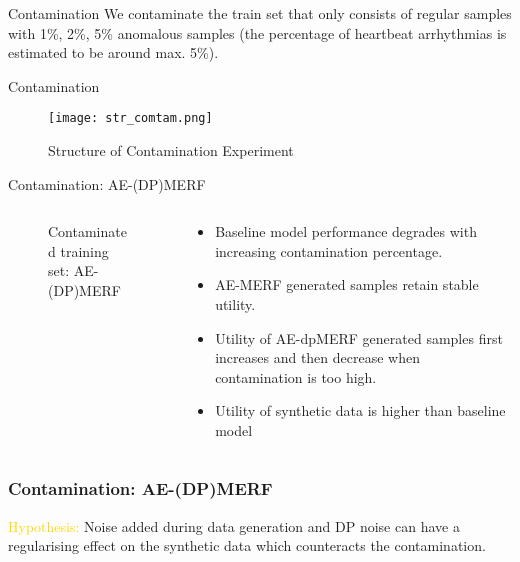 \begin{frame}{Contamination}
    We \alert{contaminate} the train set that only consists of regular samples with \alert{1\%, 2\%, 5\% anomalous samples} (the percentage of heartbeat arrhythmias is estimated to be around max. 5\%).
\end{frame}

\begin{frame}{Contamination}

    \begin{figure}[h]
        \centering
        \texttt{[image: str\_comtam.png]}
        \caption{Structure of Contamination Experiment}
        \label{fig:enter-label}
    \end{figure}

\end{frame}

\begin{frame}{Contamination: AE-(DP)MERF}
    \begin{columns}
        \begin{column}{0.65\textwidth}
            \begin{figure}

                \centering
        
                \caption{Contaminated training set: AE-(DP)MERF}
        
            \end{figure}
        \end{column}
        \begin{column}{0.34\textwidth}
            \begin{itemize}
                \scriptsize
                \item<2-> \alert{Baseline model} performance degrades with increasing contamination percentage.
                \item<3-> \alert{AE-MERF} generated samples retain stable utility.
                \item<4-> Utility of \alert{AE-dpMERF} generated samples first increases and then decrease when contamination is too high.
                \item<5-> Utility of synthetic data is higher than baseline model    
            \end{itemize}
        \end{column}
    \end{columns}
    
\end{frame}

\begin{frame}
    \frametitle{Contamination: AE-(DP)MERF}

    \textcolor{gold}{Hypothesis: } Noise added during data generation and DP noise can have a \alert{regularising effect} on the synthetic data which counteracts the contamination.

\end{frame}

